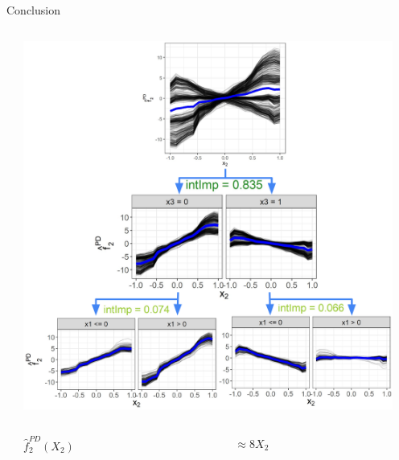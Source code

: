 \documentclass[11pt,compress,t,notes=noshow, aspectratio=169, xcolor=table,dvipsnames]{beamer}
\begin{document}
\begin{frame}{Conclusion}
\begin{columns}[T, totalwidth = \textwidth]
\begin{column}{0.53\textwidth}
    \end{column}
    \begin{column}{0.45\textwidth}
    \centering
    \includegraphics[width=0.95\textwidth]{figure/sim1}
    \vspace{-8pt}
        \begin{columns}[T, totalwidth = \linewidth]
     \footnotesize
            \begin{column}{0.125\linewidth}
            \centering
             $\hat{f}_2^{PD}(X_2)$ %
         \end{column}
         \begin{column}{0.175\linewidth}
         \centering
             $\approx 8X_2$ %

\end{column}
\end{columns}
\end{column}
\end{columns}
\end{frame}
\end{document}
